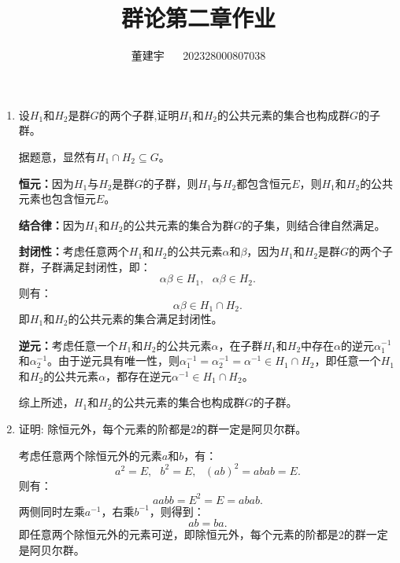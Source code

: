 \documentclass[reqno,a4paper,12pt]{amsart}
\title{群论第二章作业}
\author{董建宇 ~~ 202328000807038}
\begin{document}
\maketitle
\titleformat{\section}[hang]{\small}{\thesection}{0.8em}{}{}
\titleformat{\subsection}[hang]{\small}{\thesubsection}{0.8em}{}{}

\begin{enumerate}[1.]
\item 设$H_1$和$H_2$是群$G$的两个子群,证明$H_1$和$H_2$的公共元素的集合也构成群$G$的子群。
\begin{tcolorbox}[breakable, colback = black!5!white, colframe = black]
据题意，显然有$H_1 \cap H_2 \subseteq G$。

\textbf{恒元：}因为$H_1$与$H_2$是群$G$的子群，则$H_1$与$H_2$都包含恒元$E$，则$H_1$和$H_2$的公共元素也包含恒元$E$。

\textbf{结合律：}因为$H_1$和$H_2$的公共元素的集合为群$G$的子集，则结合律自然满足。

\textbf{封闭性：}考虑任意两个$H_1$和$H_2$的公共元素$\alpha$和$\beta$，因为$H_1$和$H_2$是群$G$的两个子群，子群满足封闭性，即：
\[
	\alpha\beta \in H_1, \ \ \ \alpha\beta \in H_2.
\]
则有：
\[
	\alpha\beta \in H_1 \cap H_2.
\]
即$H_1$和$H_2$的公共元素的集合满足封闭性。

\textbf{逆元：}考虑任意一个$H_1$和$H_2$的公共元素$\alpha$，在子群$H_1$和$H_2$中存在$\alpha$的逆元$\alpha_1^{-1}$和$\alpha_2^{-1}$。由于逆元具有唯一性，则$\alpha_1^{-1} = \alpha_2^{-1} = \alpha^{-1}\in H_1 \cap H_2$，即任意一个$H_1$和$H_2$的公共元素$\alpha$，都存在逆元$\alpha^{-1}\in H_1 \cap H_2$。

综上所述，$H_1$和$H_2$的公共元素的集合也构成群$G$的子群。
\end{tcolorbox}

\item 证明: 除恒元外，每个元素的阶都是$2$的群一定是阿贝尔群。
\begin{tcolorbox}[breakable, colback = black!5!white, colframe = black]
考虑任意两个除恒元外的元素$a$和$b$，有：
\[
	a^2 = E, \ \ \ b^2 = E, \ \ \ (ab)^2 = abab = E.
\]
则有：
\[
	aabb = E^2 = E = abab.
\]
两侧同时左乘$a^{-1}$，右乘$b^{-1}$，则得到：
\[
	ab = ba.
\]
即任意两个除恒元外的元素可逆，即除恒元外，每个元素的阶都是2的群一定是阿贝尔群。
\end{tcolorbox}


\end{enumerate}
\end{document}

